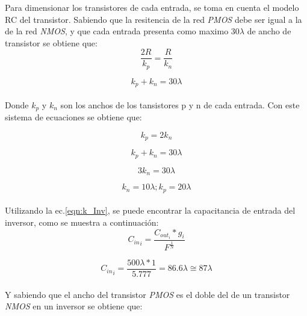 \documentclass[12pt,a4paper]{article} %
\begin{document}
Para dimensionar los transistores de cada entrada, se toma en cuenta el modelo RC del transistor. Sabiendo que la resitencia de la red \textit{PMOS} debe ser igual a la de la red \textit{NMOS}, y que cada entrada presenta como maximo 30$\lambda$ de ancho de transistor se obtiene que:\\

\begin{equation}\label{eqn:R}
\frac{2R}{k_p} = \frac{R}{k_n}
\end{equation}

\begin{equation}\label{eqn:k}
k_p + k_n = 30\lambda
\end{equation}\\

Donde \textit{$k_{p}$} y \textit{$k_{n}$} son los anchos de los tansistores p y n de cada entrada. Con este sistema de ecuaciones se obtiene que:

\begin{equation}\label{eqn:R1}
k_p = 2k_n
\end{equation}

\begin{equation}\label{eqn:k1}
k_p + k_n = 30\lambda
\end{equation}

\begin{equation}\label{eqn:k2}
3k_n = 30\lambda
\end{equation}

\begin{equation}\label{eqn:k3}
k_n = 10\lambda ; k_p = 20\lambda
\end{equation}\\

Utilizando la ec.\ref{eqn:k_Inv}, se puede encontrar la capacitancia de entrada del inversor, como se muestra a continuación:\\

\begin{equation}\label{eqn:k_Inv}
{C_{in}}_{i}= \frac{C_{out}_{i}*g_{i}}{F^{\frac{1}{N}}}
\end{equation}

\begin{equation}\label{eqn:k_Inv2}
{C_{in}}_{i}= \frac{500\lambda*1}{5.777} = 86.6\lambda \cong 87\lambda
\end{equation}\\

Y sabiendo que el ancho del transistor \textit{PMOS} es el doble del de un transistor \textit{NMOS} en un inversor se obtiene que:\\
\end{document}
